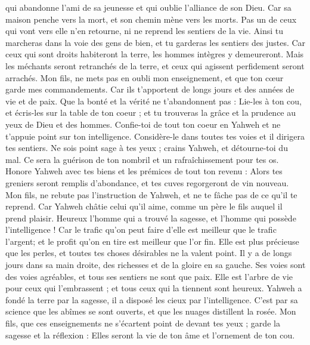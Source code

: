 \begin{multicols}{2}
qui abandonne l'ami de sa jeunesse et qui oublie l'alliance de son Dieu.
Car sa maison penche vers la mort, et son chemin mène vers les morts.
Pas un de ceux qui vont vers elle n'en retourne, ni ne reprend les sentiers de la vie.
Ainsi tu marcheras dans la voie des gens de bien, et tu garderas les sentiers des justes.
Car ceux qui sont droits habiteront la terre, les hommes intègres y demeureront.
Mais les méchants seront retranchés de la terre, et ceux qui agissent perfidement seront arrachés.
\VerseOne{}Mon fils, ne mets pas en oubli mon enseignement, et que ton cœur garde mes commandements.
Car ils t'apportent de longs jours et des années de vie et de paix.
Que la bonté et la vérité ne t'abandonnent pas : Lie-les à ton cou, et écris-les sur la table de ton coeur ;
et tu trouveras la grâce et la prudence au yeux de Dieu et des hommes.
Confie-toi de tout ton coeur en Yahweh et ne t'appuie point sur ton intelligence.
Considère-le dans toutes tes voies et il dirigera tes sentiers.
Ne sois point sage à tes yeux ; crains Yahweh, et détourne-toi du mal.
Ce sera la guérison de ton nombril et un rafraîchissement pour tes os.
Honore Yahweh avec tes biens et les prémices de tout ton revenu :
Alors tes greniers seront remplis d'abondance, et tes cuves regorgeront de vin nouveau.
Mon fils, ne rebute pas l'instruction de Yahweh, et ne te fâche pas de ce qu'il te reprend.
Car Yahweh châtie celui qu'il aime, comme un père le fils auquel il prend plaisir.
Heureux l'homme qui a trouvé la sagesse, et l'homme qui possède l'intelligence !
Car le trafic qu'on peut faire d'elle est meilleur que le trafic l'argent; et le profit qu'on en tire est meilleur que l'or fin.
Elle est plus précieuse que les perles, et toutes tes choses désirables ne la valent point.
Il y a de longs jours dans sa main droite, des richesses et de la gloire en sa gauche.
Ses voies sont des voies agréables, et tous ses sentiers ne sont que paix.
Elle est l'arbre de vie pour ceux qui l'embrassent ; et tous ceux qui la tiennent sont heureux.
Yahweh a fondé la terre par la sagesse, il a disposé les cieux par l'intelligence.
C'est par sa science que les abîmes se sont ouverts, et que les nuages distillent la rosée.
Mon fils, que ces enseignements ne s'écartent point de devant tes yeux ; garde la sagesse et la réflexion :
Elles seront la vie de ton âme et l'ornement de ton cou.

\end{multicols}
